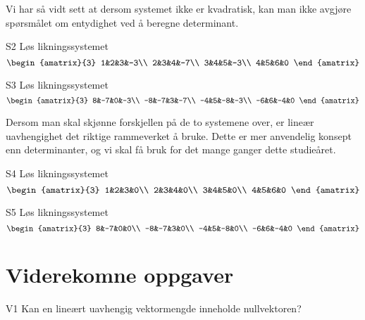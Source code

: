 Vi har så vidt sett at dersom systemet ikke er kvadratisk, 
kan man ikke avgjøre spørsmålet om entydighet ved å beregne determinant. 

\begin{oppgave}{S2}
Løs likningssystemet
\[
\begin{amatrix}{3}
1&2&3&-3\\
2&3&4&-7\\
3&4&5&-3\\
4&5&6&0
\end{amatrix}
\]
\end{oppgave}


\begin{oppgave}{S3}
Løs likningssystemet
\[
\begin{amatrix}{3}
8&-7&0&-3\\
-8&-7&3&-7\\
-4&5&-8&-3\\
-6&6&-4&0
\end{amatrix}
\]
\end{oppgave}

Dersom man skal skjønne forskjellen på de to systemene over, 
er lineær uavhengighet det riktige rammeverket å bruke. 
Dette er mer anvendelig konsept enn determinanter, 
og vi skal få bruk for det mange ganger dette studieåret.

\begin{oppgave}{S4}
Løs likningssystemet
\[
\begin{amatrix}{3}
1&2&3&0\\
2&3&4&0\\
3&4&5&0\\
4&5&6&0
\end{amatrix}
\]
\end{oppgave}


\begin{oppgave}{S5}
Løs likningssystemet
\[
\begin{amatrix}{3}
8&-7&0&0\\
-8&-7&3&0\\
-4&5&-8&0\\
-6&6&-4&0
\end{amatrix}
\]
\end{oppgave}


\section*{Viderekomne oppgaver}


\begin{oppgave}{V1}
Kan en lineært uavhengig vektormengde inneholde nullvektoren?
\end{oppgave}

